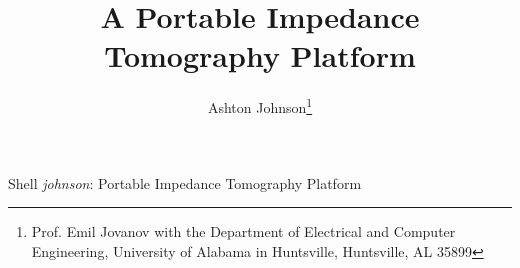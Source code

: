 \documentclass[]{IEEEtran}
\begin{document}
%
\title {A Portable Impedance\\Tomography Platform}

%
%
%

\author{Ashton Johnson\thanks{Prof. Emil Jovanov with the Department of Electrical and Computer Engineering, University of Alabama in Huntsville, Huntsville, AL 35899}}%


% 
%



%
{Shell \MakeLowercase{\textit{Johnson}}: Portable Impedance Tomography Platform}
% 
\end{document}
